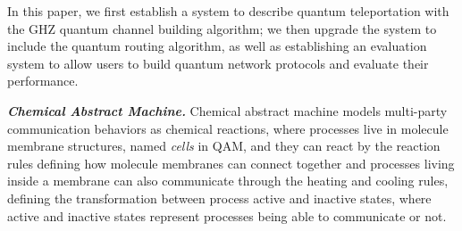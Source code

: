 In this paper, we first establish a system to describe quantum teleportation with the GHZ quantum channel building algorithm;
we then upgrade the system to include the quantum routing algorithm, as well as establishing an evaluation system to allow users to build quantum network protocols and evaluate their performance.

\noindent\textbf{\textit{Chemical Abstract Machine.}} Chemical abstract machine \cite{BERRY1992217} models multi-party communication behaviors as chemical reactions, where processes live in molecule membrane structures, named \textit{cells} in QAM, and they can react by the reaction rules defining how molecule membranes can connect together and processes living inside a membrane can also communicate through the heating and cooling rules, 
defining the transformation between process active and inactive states, where active and inactive states represent processes being able to communicate or not.

